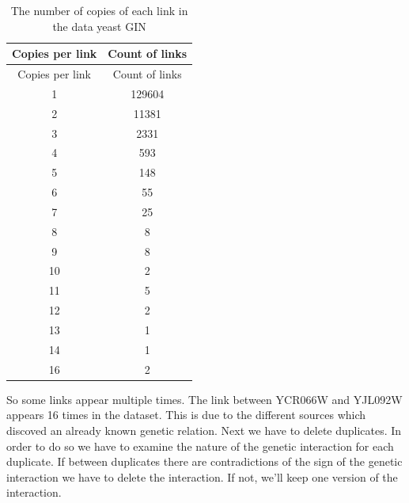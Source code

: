 \documentclass[12pt,]{article}
\newenvironment{Shaded}{\begin{snugshade}}{\end{snugshade}}
\newcommand{\KeywordTok}[1]{\textcolor[rgb]{0.13,0.29,0.53}{\textbf{{#1}}}}
\newcommand{\DataTypeTok}[1]{\textcolor[rgb]{0.13,0.29,0.53}{{#1}}}
\newcommand{\DecValTok}[1]{\textcolor[rgb]{0.00,0.00,0.81}{{#1}}}
\newcommand{\StringTok}[1]{\textcolor[rgb]{0.31,0.60,0.02}{{#1}}}
\newcommand{\NormalTok}[1]{{#1}}
\begin{document}
\begin{Shaded}
\end{Shaded}

\begin{longtable}[]{@{}cc@{}}
\caption{The number of copies of each link in the data yeast
GIN}\tabularnewline
\toprule
Copies per link & Count of links\tabularnewline
\midrule
\endfirsthead
\toprule
Copies per link & Count of links\tabularnewline
\midrule
\endhead
1 & 129604\tabularnewline
2 & 11381\tabularnewline
3 & 2331\tabularnewline
4 & 593\tabularnewline
5 & 148\tabularnewline
6 & 55\tabularnewline
7 & 25\tabularnewline
8 & 8\tabularnewline
9 & 8\tabularnewline
10 & 2\tabularnewline
11 & 5\tabularnewline
12 & 2\tabularnewline
13 & 1\tabularnewline
14 & 1\tabularnewline
16 & 2\tabularnewline
\bottomrule
\end{longtable}

So some links appear multiple times. The link between YCR066W and
YJL092W appears 16 times in the dataset. This is due to the different
sources which discoved an already known genetic relation. Next we have
to delete duplicates. In order to do so we have to examine the nature of
the genetic interaction for each duplicate. If between duplicates there
are contradictions of the sign of the genetic interaction we have to
delete the interaction. If not, we'll keep one version of the
interaction.
\end{document}
